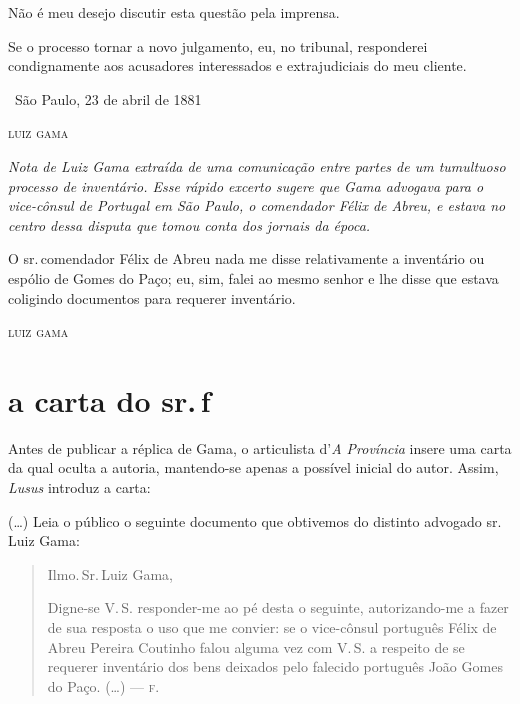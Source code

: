 Não é meu desejo discutir esta questão pela imprensa.

Se o processo tornar a novo julgamento, eu, no tribunal, responderei
condignamente aos acusadores interessados e extrajudiciais do meu
cliente.

\medskip

\hfill\ São Paulo, 23 de abril de 1881

\hfill\textsc{luiz gama}


\begin{resumo}
\emph{Nota de Luiz Gama extraída de uma comunicação entre partes de um
tumultuoso processo de inventário. Esse rápido excerto sugere que Gama
advogava para o vice-cônsul de Portugal em São Paulo, o comendador Félix
de Abreu, e estava no centro dessa disputa que tomou conta dos jornais
da época.}
\end{resumo}

O sr.\,comendador Félix de Abreu nada me disse relativamente a inventário
ou espólio de Gomes do Paço; eu, sim, falei ao mesmo senhor e lhe disse
que estava coligindo documentos para requerer inventário.

\medskip

\hfill\textsc{luiz gama}

\noindent\dotfill

\section{a carta do sr.\,f}

\begin{resumo}
Antes de publicar a réplica de Gama, o
  articulista d'\emph{A Província} insere uma carta da qual
  oculta a autoria, mantendo-se apenas a possível inicial do autor.
  Assim, \emph{Lusus} introduz a carta: 
\end{resumo}


(\ldots{}) Leia o público o seguinte
documento que obtivemos do distinto advogado sr.\,Luiz Gama:

\begin{quote}
Ilmo.\,Sr.\,Luiz Gama,

  Digne-se V.\,S. responder-me ao pé desta o seguinte, autorizando-me a
  fazer de sua resposta o uso que me convier: se o vice-cônsul português
  Félix de Abreu Pereira Coutinho falou alguma vez com V.\,S. a respeito
  de se requerer inventário dos bens deixados pelo falecido português
  João Gomes do Paço. (\ldots{}) \quad --- \textsc{f}.
\end{quote}


